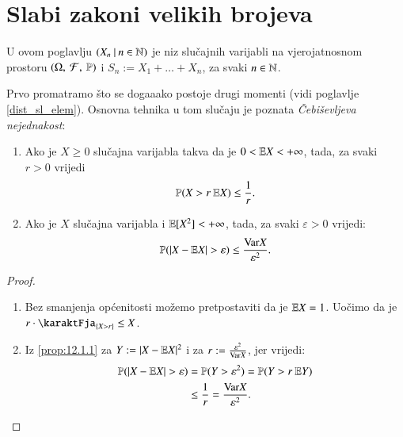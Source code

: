 
\chapter{Slabi zakoni velikih brojeva}

U ovom poglavlju $({X_n} \: | \: {n \in \mathbb{N}})$ je niz slu\v cajnih varijabli na vjerojatnosnom prostoru $(\Omega, \: \mathcal{F}, \: \mathbb{P})$ i $S_n := X_1 + \ldots + X_n$, za svaki $n \in \mathbb{N}$.

Prvo promatramo \v sto se doga\dj aako postoje drugi momenti (vidi poglavlje \ref{dist_sl_elem}).
Osnovna tehnika u tom slu\v caju je poznata \emph{\v Cebi\v sevljeva nejednakost}:

\begin{prop}    \label{prop:12.1}
    \begin{enumerate}[label=(\roman*)]
        \item   \label{prop:12.1.1}
        Ako je $X \geq 0$ slu\v cajna varijabla takva da je $0 < \mathbb{E} X < +\infty$, tada, za svaki $r > 0$ vrijedi
        \begin{equation*}
            \mathbb{P}({X > r \: \mathbb{E} X}) \leq \frac{1}{r}.
        \end{equation*}
        \item   \label{prop:12.1.2}
        Ako je $X$ slu\v cajna varijabla i $\mathbb{E} [X^2] < +\infty$, tada, za svaki $\varepsilon > 0$ vrijedi:
        \begin{equation*}
            \mathbb{P}({|X - \mathbb{E} X| > \varepsilon}) \leq \frac{\mathrm{Var} X}{\varepsilon^2}.
        \end{equation*}
    \end{enumerate}
\end{prop}

\begin{proof}
    \begin{enumerate}[label=(\roman*)]
        \item Bez smanjenja op\' cenitosti mo\v zemo pretpostaviti da je $\mathbb{E} X = 1$.
        Uo\v cimo da je $r \cdot \karaktFja_{\{X > r\}} \leq X$.
        \item Iz \ref{prop:12.1.1} za $Y:= |X - \mathbb{E} X|^2$ i za $r:= \frac{\varepsilon^2}{\mathrm{Var} X}$, jer vrijedi:
        \begin{equation*}
            \begin{aligned}
                \mathbb{P}({|X - \mathbb{E} X| > \varepsilon}) &= \mathbb{P}({Y > \varepsilon^2}) = \mathbb{P}({Y > r \: \mathbb{E} Y})\\
                & \leq \frac{1}{r} = \frac{\mathrm{Var} X}{\varepsilon^2}.
            \end{aligned}
        \end{equation*}
    \end{enumerate}
\end{proof}

